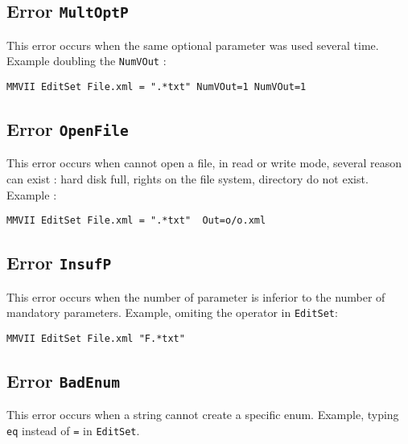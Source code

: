 
\subsection{Error {\tt MultOptP}}

This error occurs when the same optional parameter was used several time. Example doubling the {\tt NumVOut} :

\begin{verbatim}
MMVII EditSet File.xml = ".*txt" NumVOut=1 NumVOut=1
\end{verbatim}


\subsection{Error {\tt OpenFile}}

This error occurs when \PPP cannot open a file, in read or write mode, several reason can exist :
hard disk full, rights on the file system, directory do not exist. Example :

\begin{verbatim}
MMVII EditSet File.xml = ".*txt"  Out=o/o.xml
\end{verbatim}

\subsection{Error {\tt InsufP}}

This error occurs when the number of parameter is inferior to the number
of mandatory parameters.  Example, omiting the operator in {\tt EditSet}:

\begin{verbatim}
MMVII EditSet File.xml "F.*txt"
\end{verbatim}


\subsection{Error {\tt BadEnum}}

This error occurs when a string cannot create a specific enum.
Example, typing {\tt eq} instead of {\tt =} in {\tt EditSet}.

